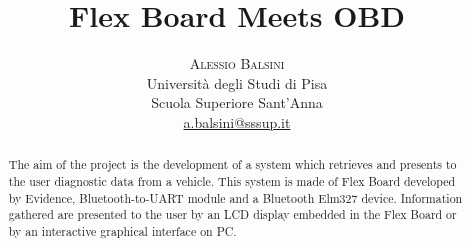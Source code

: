 \documentclass[twoside]{article}
\title{\vspace{-15mm}\fontsize{24pt}{10pt}\selectfont\textbf{Flex Board Meets OBD}} %
\author{
\large
\textsc{Alessio Balsini}\\[2mm] %
\normalsize Universit\`a degli Studi di Pisa\\ %
\normalsize Scuola Superiore Sant'Anna\\ %
\normalsize \href{mailto:a.balsini@sssup.it}{a.balsini@sssup.it} %
\vspace{-5mm}
}
\date{}
\begin{document}
\maketitle %

\thispagestyle{fancy} %


\begin{abstract}

\noindent The aim of the project is the development of a system which retrieves and presents to the user diagnostic data from a vehicle. This system is made of Flex Board developed by Evidence, Bluetooth-to-UART module and a Bluetooth Elm327 device. Information gathered are presented to the user by an LCD display embedded in the Flex Board or by an interactive graphical interface on PC.

\end{abstract}

\end{document}
